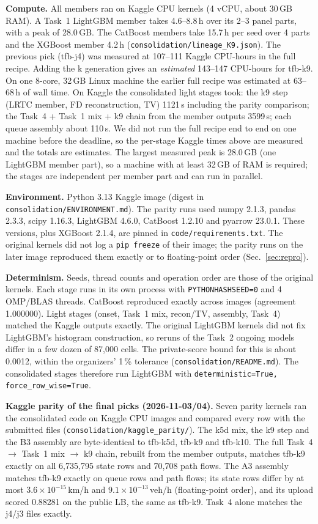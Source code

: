 \documentclass[conference,10pt]{IEEEtran}
\newcommand{\file}[1]{\texttt{\small #1}}
\begin{document}
\textbf{Compute.} All members ran on Kaggle CPU kernels (4 vCPU, about 30\,GB RAM). A Task~1 LightGBM member takes 4.6--8.8\,h over its 2--3 panel parts,
with a peak of 28.0\,GB. The CatBoost members take 15.7\,h per seed over 4 parts and the XGBoost member 4.2\,h
(\file{consolidation/lineage\_K9.json}). The previous pick (tfb-j4) was measured at 107--111 Kaggle CPU-hours in the full recipe. Adding the k
generation gives an \emph{estimated} 143--147 CPU-hours for tfb-k9. On one 8-core, 32\,GB Linux machine the earlier full recipe was
estimated at 63--68\,h of wall time. On Kaggle the consolidated light stages took: the k9 step (LRTC member, FD reconstruction, TV) 1121\,s including the parity
comparison; the Task~4 + Task~1 mix + k9 chain from the member outputs 3599\,s; each queue assembly about 110\,s.
We did not run the full recipe end to end on one machine before the deadline, so the per-stage Kaggle times above are measured and the totals are estimates. The largest measured peak is 28.0\,GB (one LightGBM member part), so a machine with at least 32\,GB of RAM is required; the stages are independent per member part and can run in parallel.

\textbf{Environment.} Python 3.13 Kaggle image (digest in \file{consolidation/ENVIRONMENT.md}). The parity runs used numpy 2.1.3, pandas 2.3.3,
scipy 1.16.3, LightGBM 4.6.0, CatBoost 1.2.10 and pyarrow 23.0.1. These versions, plus XGBoost 2.1.4, are pinned in \file{code/requirements.txt}. The original kernels did not log a \texttt{pip freeze} of their image; the parity runs on the later image reproduced them exactly or to floating-point order (Sec.~\ref{sec:repro}).

\textbf{Determinism.} Seeds, thread counts and operation order are those of the original kernels. Each stage runs in its own process with
\texttt{PYTHONHASHSEED=0} and 4 OMP/BLAS threads. CatBoost reproduced exactly across images (agreement 1.000000). Light stages (onset,
Task~1 mix, recon/TV, assembly, Task~4) matched the Kaggle outputs exactly. The original LightGBM kernels did not fix LightGBM's
histogram construction, so reruns of the Task~2 ongoing models differ in a few dozen of 87{,}000 cells. The private-score bound for this
is about 0.0012, within the organizers' 1\,\% tolerance (\file{consolidation/README.md}). The consolidated stages therefore run LightGBM with
\texttt{deterministic=True, force\_row\_wise=True}.

\textbf{Kaggle parity of the final picks (2026-11-03/04).} Seven parity kernels ran the consolidated code on Kaggle CPU images and compared
every row with the submitted files (\file{consolidation/kaggle\_parity/}). The k5d mix, the k9 step and the B3 assembly are byte-identical to
tfb-k5d, tfb-k9 and tfb-k10. The full Task~4 $\rightarrow$ Task~1 mix $\rightarrow$ k9 chain, rebuilt from the member outputs, matches
tfb-k9 exactly on all 6{,}735{,}795 state rows and 70{,}708 path flows. The A3 assembly matches tfb-k9 exactly on queue rows and path flows;
its state rows differ by at most $3.6\times10^{-15}$\,km/h and $9.1\times10^{-13}$\,veh/h (floating-point order), and its upload scored
0.88281 on the public LB, the same as tfb-k9. Task~4 alone matches the j4/j3 files exactly.
\end{document}
